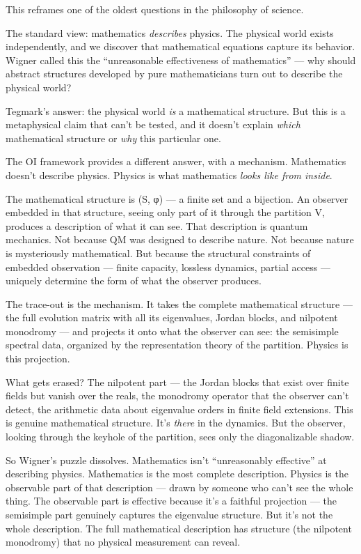 \documentclass[
]{article}
\begin{document}
This reframes one of the oldest questions in the philosophy of science.

The standard view: mathematics \emph{describes} physics. The physical
world exists independently, and we discover that mathematical equations
capture its behavior. Wigner called this the ``unreasonable
effectiveness of mathematics'' --- why should abstract structures
developed by pure mathematicians turn out to describe the physical
world?

Tegmark's answer: the physical world \emph{is} a mathematical structure.
But this is a metaphysical claim that can't be tested, and it doesn't
explain \emph{which} mathematical structure or \emph{why} this
particular one.

The OI framework provides a different answer, with a mechanism.
Mathematics doesn't describe physics. Physics is what mathematics
\emph{looks like from inside}.

The mathematical structure is (S, φ) --- a finite set and a bijection.
An observer embedded in that structure, seeing only part of it through
the partition V, produces a description of what it can see. That
description is quantum mechanics. Not because QM was designed to
describe nature. Not because nature is mysteriously mathematical. But
because the structural constraints of embedded observation --- finite
capacity, lossless dynamics, partial access --- uniquely determine the
form of what the observer produces.

The trace-out is the mechanism. It takes the complete mathematical
structure --- the full evolution matrix with all its eigenvalues, Jordan
blocks, and nilpotent monodromy --- and projects it onto what the
observer can see: the semisimple spectral data, organized by the
representation theory of the partition. Physics is this projection.

What gets erased? The nilpotent part --- the Jordan blocks that exist
over finite fields but vanish over the reals, the monodromy operator
that the observer can't detect, the arithmetic data about eigenvalue
orders in finite field extensions. This is genuine mathematical
structure. It's \emph{there} in the dynamics. But the observer, looking
through the keyhole of the partition, sees only the diagonalizable
shadow.

So Wigner's puzzle dissolves. Mathematics isn't ``unreasonably
effective'' at describing physics. Mathematics is the most complete
description. Physics is the observable part of that description ---
drawn by someone who can't see the whole thing. The observable part is
effective because it's a faithful projection --- the semisimple part
genuinely captures the eigenvalue structure. But it's not the whole
description. The full mathematical description has structure (the
nilpotent monodromy) that no physical measurement can reveal.
\end{document}
